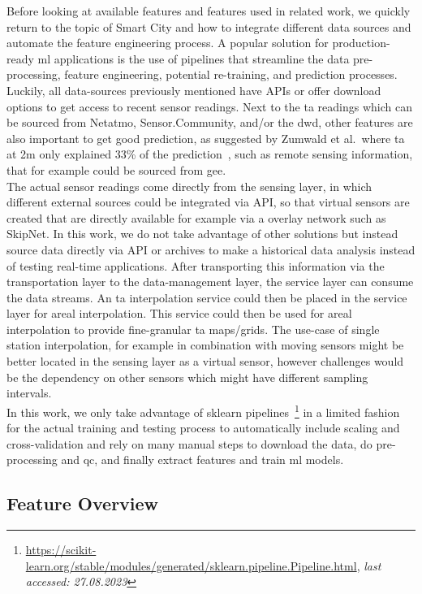 Before looking at available features and features used in related work, we quickly return to the topic of Smart City and how to integrate different data sources and automate the feature engineering process. A popular solution for production-ready \gls{ml} applications is the use of pipelines that streamline the data pre-processing, feature engineering, potential re-training, and prediction processes. Luckily, all data-sources previously mentioned have APIs or offer download options to get access to recent sensor readings. Next to the \gls{ta} readings which can be sourced from Netatmo, Sensor.Community, and/or the \gls{dwd}, other features are also important to get good prediction, as suggested by Zumwald et al.\ where \gls{ta} at 2m only explained 33\% of the prediction~\cite{zumwald2021mapping}, such as remote sensing information, that for example could be sourced from \gls{gee}.\\
The actual sensor readings come directly from the sensing layer, in which different external sources could be integrated via API, so that virtual sensors are created that are directly available for example via a overlay network such as SkipNet. In this work, we do not take advantage of other solutions but instead source data directly via API or archives to make a historical data analysis instead of testing real-time applications. After transporting this information via the transportation layer to the data-management layer, the service layer can consume the data streams. An \gls{ta} interpolation service could then be placed in the service layer for areal interpolation. This service could then be used for areal interpolation to provide fine-granular \gls{ta} maps/grids. The use-case of single station interpolation, for example in combination with moving sensors might be better located in the sensing layer as a virtual sensor, however challenges would be the dependency on other sensors which might have different sampling intervals.\\
In this work, we only take advantage of sklearn pipelines~\footnote{\url{https://scikit-learn.org/stable/modules/generated/sklearn.pipeline.Pipeline.html}, \textit{last accessed: 27.08.2023}} in a limited fashion for the actual training and testing process to automatically include scaling and cross-validation and rely on many manual steps to download the data, do pre-processing and \gls{qc}, and finally extract features and train \gls{ml} models.

\subsection{Feature Overview}

